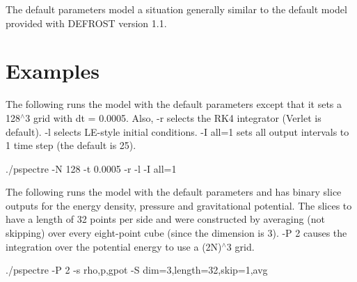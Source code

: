 \begin{DoxyParagraph}{}
The default parameters model a situation generally similar to the default model provided with DEFROST version 1.1.
\end{DoxyParagraph}
\hypertarget{running_rexamples}{}\section{Examples}\label{running_rexamples}
The following runs the model with the default parameters except that it sets a 128$^\wedge$3 grid with dt = 0.0005. Also, -\/r selects the RK4 integrator (Verlet is default). -\/l selects LE-\/style initial conditions. -\/I all=1 sets all output intervals to 1 time step (the default is 25).


\begin{DoxyCode}
 ./pspectre -N 128 -t 0.0005 -r -l -I all=1
\end{DoxyCode}


The following runs the model with the default parameters and has binary slice outputs for the energy density, pressure and gravitational potential. The slices to have a length of 32 points per side and were constructed by averaging (not skipping) over every eight-\/point cube (since the dimension is 3). -\/P 2 causes the integration over the potential energy to use a (2N)$^\wedge$3 grid.


\begin{DoxyCode}
 ./pspectre -P 2 -s rho,p,gpot -S dim=3,length=32,skip=1,avg
\end{DoxyCode}
 